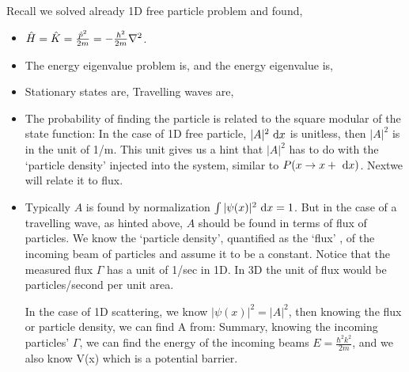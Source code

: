 \documentclass{school-22.101-notes}
\begin{document}
Recall we solved already 1D free particle problem and found, 
\begin{itemize}
\item $\hat{H} = \hat{K} = \frac{\hat{p}^2}{2m} = - \frac{\hbar^2}{2m} \nabla^2$. 

\item The energy eigenvalue problem is, 
  and the energy eigenvalue is, 

\item Stationary states are, 
  Travelling waves are, 

\item The probability of finding the particle is related to the square modular of the state function:
In the case of 1D free particle, $|A|^2 \mbox{ }\mathrm{d} x$ is unitless, then $|A|^2$ is in the unit of 1/m. This unit gives us a hint that $|A|^2$ has to do with the `particle density' injected into the system, similar to $P(x\to x+\mbox{ }\mathrm{d} x)$. Nextwe will relate it to flux. 

\item Typically $A$ is found by normalization $\int |\psi(x)|^2 \mbox{ }\mathrm{d} x = 1$. But in the case of a travelling wave, as hinted above, $A$ should be found in terms of flux of particles. We know the `particle density', quantified as the `flux' , of the incoming beam of particles and assume it to be a constant. 
Notice that the measured flux $\Gamma$ has a unit of 1/sec in 1D. In 3D the unit of flux would be particles/second per unit area. 

In the case of 1D scattering, we know $|\psi(x)|^2 = |A|^2$, then knowing the flux or particle density, we can find A from:
Summary, knowing the incoming particles' $\Gamma$, we can find the energy of the incoming beams $E = \frac{\hbar^2 k^2}{2m}$, and we also know V(x) which is a potential barrier.


\end{itemize}
\end{document}
